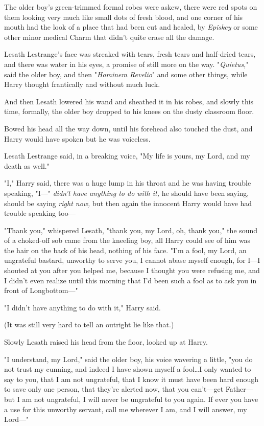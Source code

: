 The older boy's green-trimmed formal robes were askew, there were red spots on
them looking very much like small dots of fresh blood, and one corner of his
mouth had the look of a place that had been cut and healed, by \emph{Episkey}
or some other minor medical Charm that didn't quite erase all the damage.

Lesath Lestrange's face was streaked with tears, fresh tears and half-dried
tears, and there was water in his eyes, a promise of still more on the way.
"\emph{Quietus,}" said the older boy, and then "\emph{Hominem Revelio}" and
some other things, while Harry thought frantically and without much luck.

And then Lesath lowered his wand and sheathed it in his robes, and slowly this
time, formally, the older boy dropped to his knees on the dusty classroom floor.

Bowed his head all the way down, until his forehead also touched the dust, and
Harry would have spoken but he was voiceless.

Lesath Lestrange said, in a breaking voice, "My life is yours, my Lord, and my
death as well."

"I," Harry said, there was a huge lump in his throat and he was having trouble
speaking, "I—" \emph{didn't have anything to do with it,} he should have been
saying, should be saying \emph{right now,} but then again the innocent Harry
would have had trouble speaking too—

"Thank you," whispered Lesath, "thank you, my Lord, oh, thank you," the sound
of a choked-off sob came from the kneeling boy, all Harry could see of him was
the hair on the back of his head, nothing of his face. "I'm a fool, my Lord, an
ungrateful bastard, unworthy to serve you, I cannot abase myself enough, for
I—I shouted at you after you helped me, because I thought you were refusing
me, and I didn't even realize until this morning that I'd been such a fool as
to ask you in front of Longbottom—"

"I didn't have anything to do with it," Harry said.

(It was still very hard to tell an outright lie like that.)

Slowly Lesath raised his head from the floor, looked up at Harry.

"I understand, my Lord," said the older boy, his voice wavering a little, "you
do not trust my cunning, and indeed I have shown myself a fool…I only
wanted to say to you, that I am not ungrateful, that I know it must have been
hard enough to save only one person, that they're alerted now, that you
can't—get Father—but I am not ungrateful, I will never be ungrateful to you
again. If ever you have a use for this unworthy servant, call me wherever I am,
and I will answer, my Lord—"


